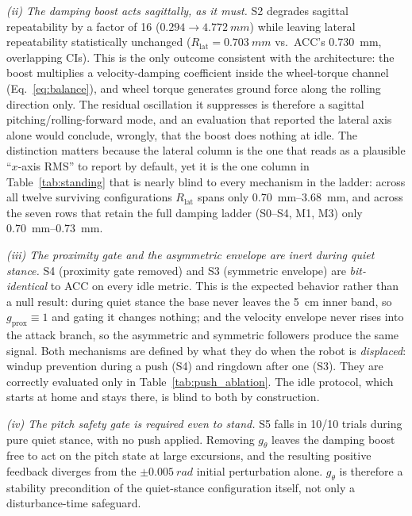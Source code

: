 \documentclass[conference]{IEEEtran}
\begin{document}
\emph{(ii) The damping boost acts sagittally, as it must.} S2 degrades sagittal
repeatability by a factor of \num{16} ($0.294\rightarrow\SI{4.772}{mm}$) while
leaving lateral repeatability statistically unchanged
($R_{\text{lat}}=\SI{0.703}{mm}$ vs.\ ACC's \SI{0.730}{mm}, overlapping CIs). This
is the only outcome consistent with the architecture: the boost multiplies a
velocity-damping coefficient inside the wheel-torque channel
(Eq.~\eqref{eq:balance}), and wheel torque generates ground force along the
rolling direction only. The residual oscillation it suppresses is therefore a
sagittal pitching/rolling-forward mode, and an evaluation that reported the
lateral axis alone would conclude, wrongly, that the boost does nothing at idle.
The distinction matters because the lateral column is the one that reads as a
plausible ``$x$-axis RMS'' to report by default, yet it is the one column in
Table~\ref{tab:standing} that is nearly blind to every mechanism in the ladder:
across all twelve surviving configurations $R_{\text{lat}}$ spans only
\SIrange{0.70}{3.68}{mm}, and across the seven rows that retain the full damping
ladder (S0--S4, M1, M3) only \SIrange{0.70}{0.73}{mm}.

\emph{(iii) The proximity gate and the asymmetric envelope are inert during quiet
stance.} S4 (proximity gate removed) and S3 (symmetric envelope) are
\emph{bit-identical} to ACC on every idle metric. This is the expected behavior
rather than a null result: during quiet stance the base never leaves the \SI{5}{cm}
inner band, so $g_{\text{prox}}{\equiv}1$ and gating it changes nothing; and the
velocity envelope never rises into the attack branch, so the asymmetric and symmetric
followers produce the same signal. Both mechanisms are defined by what they do when
the robot is \emph{displaced}: windup prevention during a push (S4) and ringdown after one (S3). They are correctly evaluated only in Table~\ref{tab:push_ablation}.
The idle protocol, which starts at home and stays there, is blind to both by
construction.

\emph{(iv) The pitch safety gate is required even to stand.} S5 falls in
\num{10}/\num{10} trials during pure quiet stance, with no push applied. Removing
$g_\theta$ leaves the damping boost free to act on the pitch state at large
excursions, and the resulting positive feedback diverges from the ${\pm}\SI{0.005}{rad}$
initial perturbation alone. $g_\theta$ is therefore a stability precondition of
the quiet-stance configuration itself, not only a disturbance-time safeguard.
\end{document}
